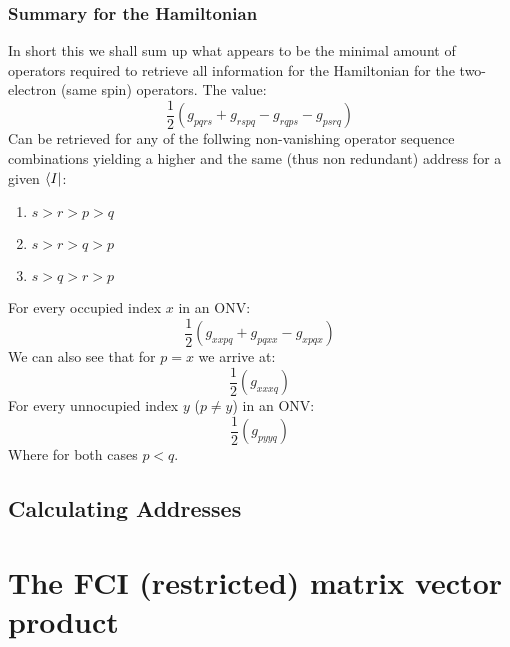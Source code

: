 \documentclass[12p]{article}
\begin{document}
\subsubsection{Summary for the Hamiltonian}
In short this we shall sum up what appears to be the minimal amount of operators required to retrieve all information for the Hamiltonian for the two-electron (same spin) operators.
The value:
\begin{equation}
  \frac{1}{2} (g_{pqrs} + g_{rspq} - g_{rqps} - g_{psrq})
\end{equation}
 Can be retrieved for any of the follwing non-vanishing operator sequence combinations yielding a higher and the same (thus non redundant) address for a given $\bra{I}$:
\begin{enumerate}
  \item $s > r > p > q$
  \item $s > r > q > p$
  \item $s > q > r > p$
\end{enumerate}
For every occupied index $x$ in an ONV:
\begin{equation}
  \frac{1}{2} (g_{xxpq} + g_{pqxx} - g_{xpqx})
\end{equation}
We can also see that for $p=x$ we arrive at:
\begin{equation}
  \frac{1}{2} (g_{xxxq})
\end{equation}
For every unnocupied index $y$ ($p \neq y$) in an ONV:
\begin{equation}
  \frac{1}{2} (g_{pyyq})
\end{equation}
Where for both cases $p<q$.
\subsection{Calculating Addresses}

\section{The FCI (restricted) matrix vector product}
\end{document}
